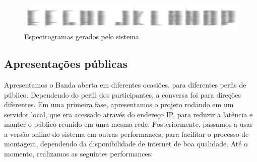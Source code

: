 \begin{figure}
    
        \includegraphics[width=1\textwidth]{pictures/spectrogram}
        \vspace{-10pt}
    \caption{Espectrogramas gerados pelo sistema.}
    \vspace{-10pt}
    \label{fig:spectro}
\end{figure}







\subsection{Apresentações públicas}
Apresentamos o Banda aberta em diferentes ocasiões, para diferentes perfis de público. Dependendo do perfil dos participantes, a conversa foi para direções diferentes. Em uma primeira fase, apresentamos o projeto rodando em um servidor local, que era acessado através do endereço IP, para reduzir a latência e manter o público reunido em uma mesma rede. Posteriormente, passamos a usar a versão online do sistema em outras performances, para facilitar o processo de montagem, dependendo da disponibilidade de internet de boa qualidade. Até o momento, realizamos as seguintes performances:

